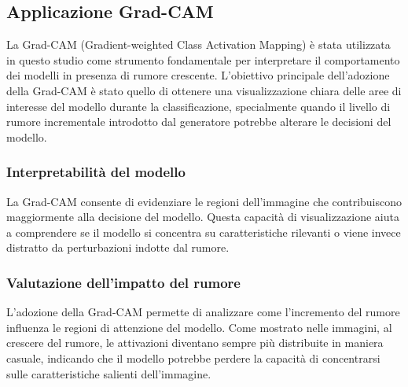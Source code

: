 \subsection{Applicazione Grad-CAM}
La Grad-CAM (Gradient-weighted Class Activation Mapping)\cite{site:gradcam} è stata utilizzata in questo studio come strumento fondamentale per interpretare il comportamento dei modelli in presenza di rumore crescente. L'obiettivo principale dell'adozione della Grad-CAM è stato quello di ottenere una visualizzazione chiara delle aree di interesse del modello durante la classificazione, specialmente quando il livello di rumore incrementale introdotto dal generatore potrebbe alterare le decisioni del modello.
\subsubsection{Interpretabilità del modello}
La Grad-CAM consente di evidenziare le regioni dell'immagine che contribuiscono maggiormente alla decisione del modello. Questa capacità di visualizzazione aiuta a comprendere se il modello si concentra su caratteristiche rilevanti o viene invece distratto da perturbazioni indotte dal rumore.
\subsubsection{Valutazione dell'impatto del rumore}
L'adozione della Grad-CAM permette di analizzare come l'incremento del rumore influenza le regioni di attenzione del modello. Come mostrato nelle immagini, al crescere del rumore, le attivazioni diventano sempre più distribuite in maniera casuale, indicando che il modello potrebbe perdere la capacità di concentrarsi sulle caratteristiche salienti dell'immagine.

